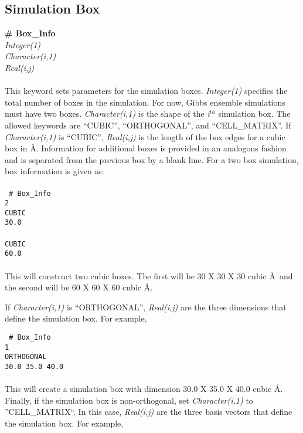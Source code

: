 \subsection{Simulation Box}\label{sec:Box_Info}
{\bf \# Box\_Info} \\
{\it Integer(1)} \\
{\it Character(i,1)}  \\
{\it Real(i,j)} \\ \\
This keyword sets parameters for the simulation boxes. 
{\it   Integer(1)} specifies the total number of boxes in the
simulation. For now, Gibbs ensemble simulations must have two boxes. 
{\it Character(i,1)} is the shape of the {\it i$^{th}$} simulation
box. The allowed keywords are ``CUBIC'', ``ORTHOGONAL'', and ``CELL\_MATRIX''.
%
If {\it Character(i,1)} is ``CUBIC'', \emph{Real(i,j)} is the length 
of the box edges for a cubic box in \AA. 
Information for additional boxes is provided in an analogous fashion
and is separated from the previous box by a blank line. For a two box
simulation, box information is given as: \\ \\ 
%
\texttt{
\# Box\_Info \\
 2 \\
 CUBIC \\
 30.0  \\
 \\
 CUBIC \\
 60.0}
\\ \\
This will construct two cubic boxes. The first will be 30 X 30 X 30
cubic \AA\ and the second will be 60 X 60 X 60 cubic \AA.

If {\it Character(i,1)} is ``ORTHOGONAL'', \emph{Real(i,j)} are the three
dimensions that define the simulation box. For example, 

\texttt{
\# Box\_Info \\
 1 \\
 ORTHOGONAL \\
 30.0 35.0 40.0}
\\ \\

This will create a simulation box with dimension 30.0 X 35.0 X 40.0 cubic \AA. \\

Finally, if the simulation box is non-orthogonal, set {\it Character(i,1)} to
''CELL\_MATRIX``. In this case, \emph{Real(i,j)} are
the three basis vectors that define the simulation box. For example, 

